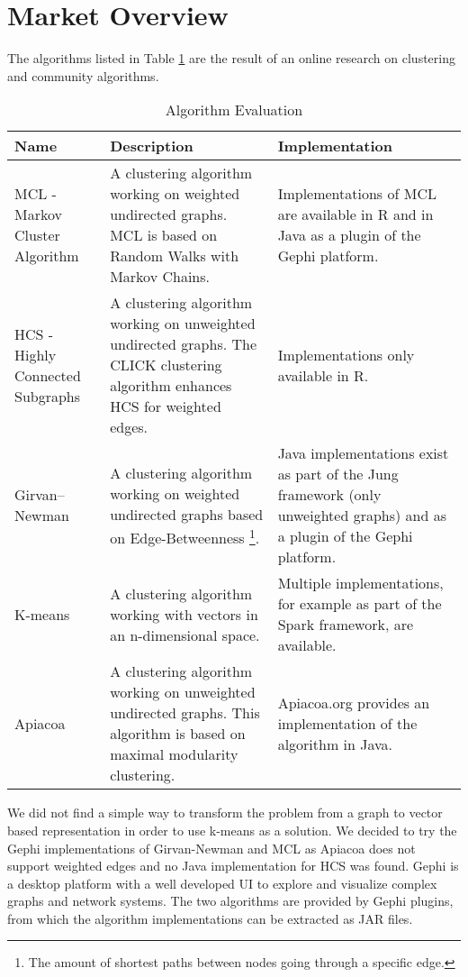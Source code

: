 \section{Market Overview}

The algorithms listed in Table \ref{tab:algorithmEvaluation} are the result of an online research on clustering and community algorithms.

\begin{table}[H]
	\centering
	\caption{Algorithm Evaluation}
	\label{tab:algorithmEvaluation}
	\begin{tabular}{|p{90pt}|p{200pt}|p{130pt}|}
		\hline	
		Name & Description & Implementation \\
		\hline
		MCL - Markov Cluster Algorithm\cite{markovCluster} & A clustering algorithm working on weighted undirected graphs. MCL is based on Random Walks with Markov Chains. & Implementations of MCL are available in R and in Java as a plugin of the Gephi\cite{gephi} platform.  \\
		\hline
		HCS - Highly Connected Subgraphs\cite{hcs} & A clustering algorithm working on unweighted undirected graphs. The CLICK clustering algorithm enhances HCS for weighted edges. & Implementations only available in R.  \\
		\hline
		Girvan–Newman\cite{girvan} & A clustering algorithm working on weighted undirected graphs based on Edge-Betweenness \footnote{The amount of shortest paths between nodes going through a specific edge.}. & Java implementations exist as part of the Jung\cite{jung} framework (only unweighted graphs) and as a plugin of the Gephi\cite{gephi} platform. \\
		\hline	
		K-means\cite{kmeans} & A clustering algorithm working with vectors in an n-dimensional space. & Multiple implementations, for example as part of the Spark\cite{spark} framework, are available. \\
		\hline
		Apiacoa\cite{apiacoa} & A clustering algorithm working on unweighted undirected graphs. This algorithm is based on maximal modularity clustering. & Apiacoa.org provides an implementation of the algorithm in Java. \\
		\hline
	\end{tabular}
\end{table}

We did not find a simple way to transform the problem from a graph to vector based representation in order to use k-means as a solution. We  decided to try the Gephi implementations of Girvan-Newman and MCL as Apiacoa does not support weighted edges and no Java implementation for HCS was found. Gephi is a desktop platform with a well developed \gls{UI} to explore and visualize complex graphs and network systems. The two algorithms are provided by Gephi plugins, from which the algorithm implementations can be extracted as \gls{JAR} files. 

